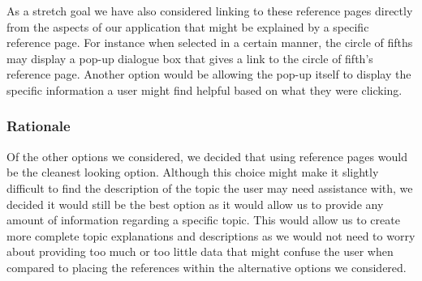 \documentclass[onecolumn, draftclsnofoot,10pt, compsoc]{IEEEtran}
\begin{document}
As a stretch goal we have also considered linking to these reference pages directly from the aspects of our application that might be explained by a specific reference page.
For instance when selected in a certain manner, the circle of fifths may display a pop-up dialogue box that gives a link to the circle of fifth’s reference page.
Another option would be allowing the pop-up itself to display the specific information a user might find helpful based on what they were clicking.

\subsubsection{Rationale}
Of the other options we considered, we decided that using reference pages would be the cleanest looking option.
Although this choice might make it slightly difficult to find the description of the topic the user may need assistance with, we decided it would still be the best option as it would allow us to provide any amount of information regarding a specific topic.
This would allow us to create more complete topic explanations and descriptions as we would not need to worry about providing too much or too little data that might confuse the user when compared to placing the references within the alternative options we considered.

%
%
\end{document}
